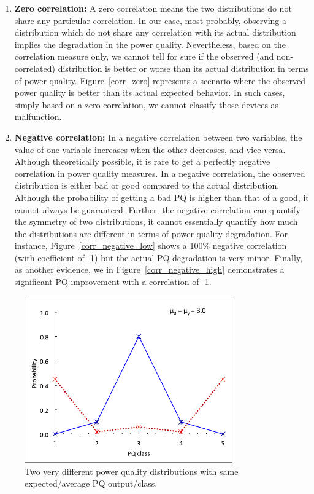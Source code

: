 \begin{enumerate}
\item \textbf{Zero correlation:} A zero correlation means the two distributions do not share any particular correlation. In our case, most probably, observing a distribution which do not share any correlation with its actual distribution implies the degradation in the power quality. Nevertheless, based on the correlation measure only, we cannot tell for sure if the observed (and non-correlated) distribution is better or worse than its actual distribution in terms of power quality. Figure~\ref{corr_zero} represents a scenario where the observed power quality is better than its actual expected behavior. In such cases, simply based on a zero correlation, we cannot classify those devices as malfunction.

\item \textbf{Negative correlation:} In a negative correlation between two variables, the value of one variable increases when the other decreases, and vice versa. Although theoretically possible, it is rare to get a perfectly negative correlation in power quality measures. In a negative correlation, the observed distribution is either bad or good compared to the actual distribution. Although the probability of getting a bad PQ is higher than that of a good, it cannot always be guaranteed. Further, the negative correlation can quantify the symmetry of two distributions, it cannot essentially quantify how much the distributions are different in terms of power quality degradation. For instance, Figure~\ref{corr_negative_low} shows a 100\% negative correlation (with coefficient of -1) but the actual PQ degradation is very minor. Finally, as another evidence, we in Figure~\ref{corr_negative_high} demonstrates a significant PQ improvement with a correlation of -1.

\end{enumerate}

\begin{figure}[!p]
\centering
\includegraphics[width=0.8\textwidth]{average_pq_exception}
\caption{Two very different power quality distributions with same expected/average PQ output/class.}
\label{fig:average_pq_exception}
\end{figure}

